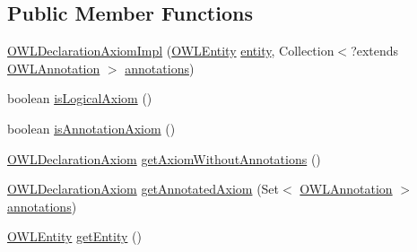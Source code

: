 \subsection*{Public Member Functions}
\begin{DoxyCompactItemize}
\item 
\hyperlink{classuk_1_1ac_1_1manchester_1_1cs_1_1owl_1_1owlapi_1_1_o_w_l_declaration_axiom_impl_ab4d25395fb7318ebb9d3c11d9f4d40dc}{O\-W\-L\-Declaration\-Axiom\-Impl} (\hyperlink{interfaceorg_1_1semanticweb_1_1owlapi_1_1model_1_1_o_w_l_entity}{O\-W\-L\-Entity} \hyperlink{classuk_1_1ac_1_1manchester_1_1cs_1_1owl_1_1owlapi_1_1_o_w_l_declaration_axiom_impl_ad670ccd08ef4703402bd77ec5ff9348f}{entity}, Collection$<$?extends \hyperlink{interfaceorg_1_1semanticweb_1_1owlapi_1_1model_1_1_o_w_l_annotation}{O\-W\-L\-Annotation} $>$ \hyperlink{classuk_1_1ac_1_1manchester_1_1cs_1_1owl_1_1owlapi_1_1_o_w_l_axiom_impl_af6fbf6188f7bdcdc6bef5766feed695e}{annotations})
\item 
boolean \hyperlink{classuk_1_1ac_1_1manchester_1_1cs_1_1owl_1_1owlapi_1_1_o_w_l_declaration_axiom_impl_a4059e01e3885f03615aca6b7e3e6e5ec}{is\-Logical\-Axiom} ()
\item 
boolean \hyperlink{classuk_1_1ac_1_1manchester_1_1cs_1_1owl_1_1owlapi_1_1_o_w_l_declaration_axiom_impl_a4d7b1ea6e02806737af1910c601ea0fe}{is\-Annotation\-Axiom} ()
\item 
\hyperlink{interfaceorg_1_1semanticweb_1_1owlapi_1_1model_1_1_o_w_l_declaration_axiom}{O\-W\-L\-Declaration\-Axiom} \hyperlink{classuk_1_1ac_1_1manchester_1_1cs_1_1owl_1_1owlapi_1_1_o_w_l_declaration_axiom_impl_abc2731d19250863b843976f2605b8062}{get\-Axiom\-Without\-Annotations} ()
\item 
\hyperlink{interfaceorg_1_1semanticweb_1_1owlapi_1_1model_1_1_o_w_l_declaration_axiom}{O\-W\-L\-Declaration\-Axiom} \hyperlink{classuk_1_1ac_1_1manchester_1_1cs_1_1owl_1_1owlapi_1_1_o_w_l_declaration_axiom_impl_a8930039e793afb855b5626b84e334acf}{get\-Annotated\-Axiom} (Set$<$ \hyperlink{interfaceorg_1_1semanticweb_1_1owlapi_1_1model_1_1_o_w_l_annotation}{O\-W\-L\-Annotation} $>$ \hyperlink{classuk_1_1ac_1_1manchester_1_1cs_1_1owl_1_1owlapi_1_1_o_w_l_axiom_impl_af6fbf6188f7bdcdc6bef5766feed695e}{annotations})
\item 
\hyperlink{interfaceorg_1_1semanticweb_1_1owlapi_1_1model_1_1_o_w_l_entity}{O\-W\-L\-Entity} \hyperlink{classuk_1_1ac_1_1manchester_1_1cs_1_1owl_1_1owlapi_1_1_o_w_l_declaration_axiom_impl_a36fc7fd9ec5036f96ca6004c61a39263}{get\-Entity} ()
\item 

\end{DoxyCompactItemize}
